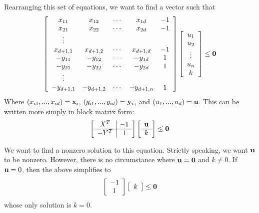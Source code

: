 \documentclass[12pt]{scrippsthesis}
\theoremstyle{definition}
\theoremstyle{remark}
\theoremstyle{plain}
\begin{document}
Rearranging this set of equations, we want to find a vector such that
\begin{equation}
\left[\begin{array}{ccccc}
x_{11}&x_{12}&\cdots&x_{1d}&-1\\
x_{21}&x_{22}&\cdots&x_{2d}&-1\\
\vdots \\
x_{d+1,1}&x_{d+1,2}&\cdots&x_{d+1,d}&-1\\
-y_{11}&-y_{12}&\cdots&-y_{1d}&1 \\
-y_{21}&-y_{22}&\cdots&-y_{2d}&1 \\
\vdots \\
-y_{d+1,1}&-y_{d+1,2}&\cdots&-y_{d+1,n}&1
\end{array}\right]
\left[\begin{array}{c} u_1\\u_2 \\\vdots \\u_n \\ k \end{array}\right]
\leq
{\bf 0}
\end{equation}
Where $(x_{i1},...,x_{id})={\bf x}_i$, $(y_{i1},...,y_{id}) = {\bf y}_i$, and $(u_{1},...,u_{d})={\bf u}$.  This can be written more simply in block matrix form:
\begin{equation}
\left[\begin{array}{c|c}
X^T& -1 \\
\hline
-Y^T& 1 \\
\end{array}\right]
\left[\begin{array}{c} {\bf u}\\\hline k \end{array}\right]
\leq {\bf 0}
\label{eq:linear inequality}
\end{equation}

We want to find a nonzero solution to this equation.  Strictly speaking, we want ${\bf u}$ to be nonzero.  However, there is no circumstance where ${\bf u}={\bf 0}$ and $k\neq0$.  If ${\bf u}=0$, then the above simplifies to
\begin{equation}
\left[\begin{array}{c}-1\\1\end{array}\right]
\left[\begin{array}{c}k\end{array}\right]
\leq {\bf 0}
\end{equation}
whose only solution is $k=0$.
 
\end{document}
